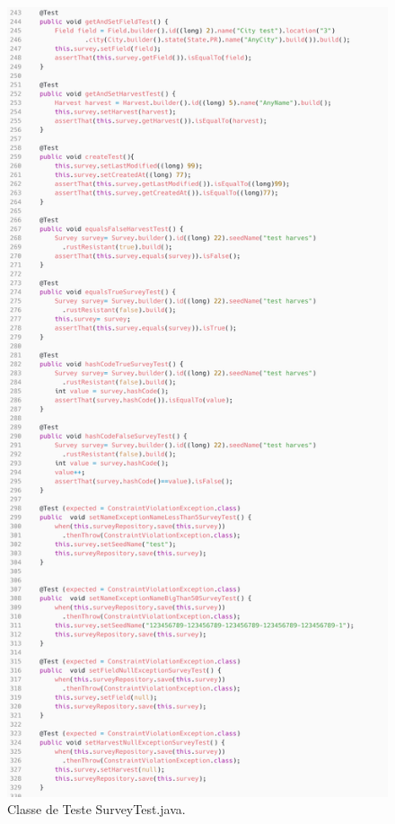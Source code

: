 \begin{figure}[H]
	\centering
	\includegraphics[scale=0.13]{dados/figuras/surveyTest3.png}
	\caption{Classe de Teste SurveyTest.java.}
	\label{testSurvey}
\end{figure}

